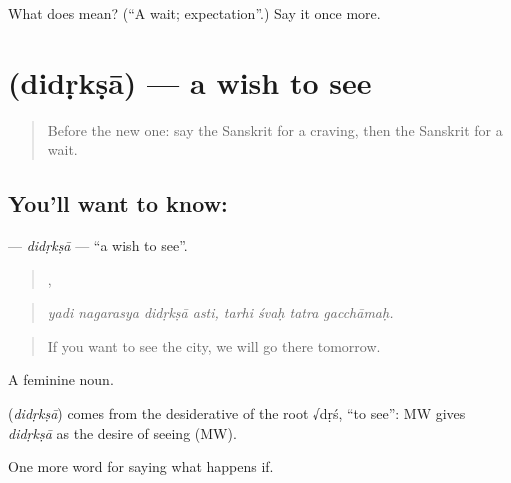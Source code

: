 \begin{tcolorbox}[breakable,colback=teal!4,colframe=teal!35!black,title={Before you move on}]
What does  mean? (\textquotedblleft{}A wait; expectation\textquotedblright{}.) Say it once more.
\end{tcolorbox}
\section[\texorpdfstring{\sk{दिदृक्षा} (didṛkṣā)}{दिदृक्षा (didṛkṣā)}]{ (didṛkṣā) — a wish to see}

\label{lesson:SA-C549-didrksa}



\begin{quote}
Before the new one: say the Sanskrit for a craving, then the Sanskrit for a wait.
\end{quote}

\subsection*{You'll want to know: }
\textbf{} — \emph{didṛkṣā} — \textquotedblleft{}a wish to see\textquotedblright{}.

\begin{quote}
   ,    
\end{quote}

\begin{quote}
\emph{yadi nagarasya didṛkṣā asti, tarhi śvaḥ tatra gacchāmaḥ.}
\end{quote}

\begin{quote}
If you want to see the city, we will go there tomorrow.
\end{quote}

A feminine noun.

\begin{cousinweb}
\textbf{} (\emph{didṛkṣā}) comes from the desiderative of the root √dṛś, \textquotedblleft{}to see\textquotedblright{}: MW gives \emph{didṛkṣā} as the desire of seeing (MW).
\end{cousinweb}

\begin{grammarlens}[title={What you've built}]
One more word for saying what happens if.
\end{grammarlens}

